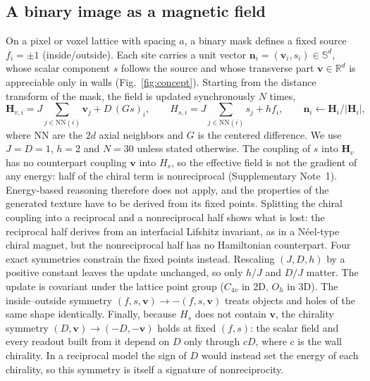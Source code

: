 \documentclass[11pt,a4paper]{article}
\newcommand{\nn}{\bm n}
\newcommand{\vv}{\bm v}
\newcommand{\Sn}{\mathbb S}
\begin{document}
\subsection*{A binary image as a magnetic field}
On a pixel or voxel lattice with spacing $a$, a binary mask defines a fixed source $f_i=\pm1$ (inside/outside). Each site carries a unit vector $\nn_i=(\vv_i,s_i)\in\Sn^d$, whose scalar component $s$ follows the source and whose transverse part $\vv\in\mathbb R^d$ is appreciable only in walls (Fig.~\ref{fig:concept}). Starting from the distance transform of the mask, the field is updated synchronously $N$ times,
\begin{equation}
\bm H_{v,i}=J\!\!\sum_{j\in\mathrm{NN}(i)}\!\!\vv_j+D\,(Gs)_i,\qquad
H_{s,i}=J\!\!\sum_{j\in\mathrm{NN}(i)}\!\! s_j+h f_i,\qquad
\nn_i\leftarrow\bm H_i/|\bm H_i|,
\label{eq:update}
\end{equation}
where NN are the $2d$ axial neighbors and $G$ is the centered difference. We use $J=D=1$, $h=2$ and $N=30$ unless stated otherwise. The coupling of $s$ into $\bm H_v$ has no counterpart coupling $\vv$ into $H_s$, so the effective field is not the gradient of any energy: half of the chiral term is nonreciprocal (Supplementary Note~1). Energy-based reasoning therefore does not apply, and the properties of the generated texture have to be derived from its fixed points. Splitting the chiral coupling into a reciprocal and a nonreciprocal half shows what is lost: the reciprocal half derives from an interfacial Lifshitz invariant, as in a N\'eel-type chiral magnet\cite{Dzyaloshinskii1958,Moriya1960}, but the nonreciprocal half has no Hamiltonian counterpart. Four exact symmetries constrain the fixed points instead. Rescaling $(J,D,h)$ by a positive constant leaves the update unchanged, so only $h/J$ and $D/J$ matter. The update is covariant under the lattice point group ($C_{4v}$ in 2D, $O_h$ in 3D). The inside--outside symmetry $(f,s,\vv)\to-(f,s,\vv)$ treats objects and holes of the same shape identically. Finally, because $H_s$ does not contain $\vv$, the chirality symmetry $(D,\vv)\to(-D,-\vv)$ holds at fixed $(f,s)$: the scalar field and every readout built from it depend on $D$ only through $cD$, where $c$ is the wall chirality. In a reciprocal model the sign of $D$ would instead set the energy of each chirality, so this symmetry is itself a signature of nonreciprocity.
\end{document}
